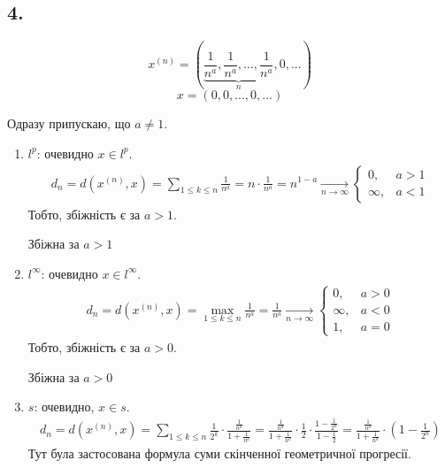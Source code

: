 \documentclass[11pt, a4paper]{article} %
\begin{document}
\subsection*{4.}
\begin{mdframed}
    \[x^{(n)} = (\underset{n}{\underbrace{\frac{1}{n^a},\frac{1}{n^a},...,\frac{1}{n^a}}},0,...)\]
    \[x = (0,0,...,0,...)\]

    Одразу припускаю, що $a \ne 1$.
\end{mdframed}
\begin{enumerate}
    \item $l^p$: очевидно $x\in l^p$.
    \begin{multline*}
        d_n = d(x^{(n)}, x) = \sum_{1 \le k \le n} \frac{1}{n^a} = n \cdot \frac{1}{n^a} = n^{1-a} 
        \underset{n\to\infty}{\longrightarrow} \begin{cases}
            0, & a > 1\\
            \infty, & a < 1
        \end{cases} 
    \end{multline*}
    Тобто, збіжність є за $a > 1$.

    \begin{mdframed}[backgroundcolor=yellow!20]
    Збіжна за $a > 1$
    \end{mdframed}
    

    \item $l^\infty$: очевидно $x\in l^\infty$.
    \begin{multline*}
        d_n = d(x^{(n)}, x) = \max_{1 \le k \le n} \frac{1}{n^a} = \frac{1}{n^a} 
        \underset{n\to\infty}{\longrightarrow} \begin{cases}
            0, & a > 0\\
            \infty, & a < 0\\
            1, & a = 0
        \end{cases}
    \end{multline*} 
    Тобто, збіжність є за $a > 0$.

    \begin{mdframed}[backgroundcolor=yellow!20]
    Збіжна за $a > 0$
    \end{mdframed}

    \item $s$: очевидно, $x \in s$.
    \begin{multline*}
        d_n = d(x^{(n)}, x) = \sum_{1\le k \le n} \frac{1}{2^k} \cdot \frac{\frac{1}{n^a}}{1+\frac{1}{n^a}} = \frac{\frac{1}{n^a}}{1+\frac{1}{n^a}} \cdot \frac{1}{2} \cdot \frac{1-\frac{1}{2^n}}{1-\frac{1}{2}} = \frac{\frac{1}{n^a}}{1+\frac{1}{n^a}} \cdot \left(1-\frac{1}{2^n}\right)
    \end{multline*}
    Тут була застосована формула суми скінченної геометричної прогресії.
    

\end{enumerate}
\end{document}
